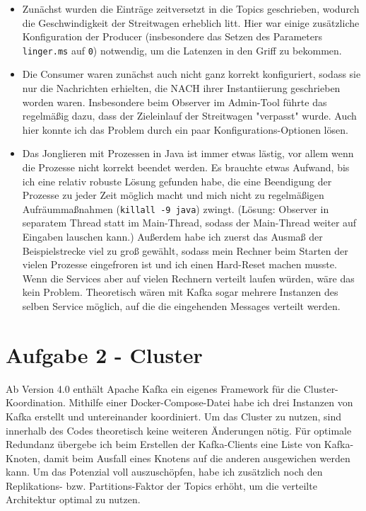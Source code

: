 \documentclass[12pt]{article}
\begin{document}
\begin{itemize}
	\item Zunächst wurden die Einträge zeitversetzt in die Topics geschrieben, wodurch die Geschwindigkeit der Streitwagen erheblich litt. 
	Hier war einige zusätzliche Konfiguration der Producer (insbesondere das Setzen des Parameters \texttt{linger.ms} auf \texttt{0}) notwendig, um die Latenzen in den Griff zu bekommen.
	
	\item Die Consumer waren zunächst auch nicht ganz korrekt konfiguriert, sodass sie nur die Nachrichten erhielten, die NACH ihrer Instantiierung geschrieben worden waren.
	Insbesondere beim Observer im Admin-Tool führte das regelmäßig dazu, dass der Zieleinlauf der Streitwagen "verpasst" wurde.
	Auch hier konnte ich das Problem durch ein paar Konfigurations-Optionen lösen.
	
	\item Das Jonglieren mit Prozessen in Java ist immer etwas lästig, vor allem wenn die Prozesse nicht korrekt beendet werden.
	Es brauchte etwas Aufwand, bis ich eine relativ robuste Lösung gefunden habe, die eine Beendigung der Prozesse zu jeder Zeit möglich macht und mich nicht zu regelmäßigen Aufräummaßnahmen (\texttt{killall -9 java}) zwingt. (Lösung: Observer in separatem Thread statt im Main-Thread, sodass der Main-Thread weiter auf Eingaben lauschen kann.)
	Außerdem habe ich zuerst das Ausmaß der Beispielstrecke viel zu groß gewählt, sodass mein Rechner beim Starten der vielen Prozesse eingefroren ist und ich einen Hard-Reset machen musste.
	Wenn die Services aber auf vielen Rechnern verteilt laufen würden, wäre das kein Problem.
	Theoretisch wären mit Kafka sogar mehrere Instanzen des selben Service möglich, auf die die eingehenden Messages verteilt werden.
\end{itemize}

\section*{Aufgabe 2 - Cluster}
Ab Version 4.0 enthält Apache Kafka ein eigenes Framework für die Cluster-Koordination.
Mithilfe einer Docker-Compose-Datei habe ich drei Instanzen von Kafka erstellt und untereinander koordiniert.
Um das Cluster zu nutzen, sind innerhalb des Codes theoretisch keine weiteren Änderungen nötig.
Für optimale Redundanz übergebe ich beim Erstellen der Kafka-Clients eine Liste von Kafka-Knoten, damit beim Ausfall eines Knotens auf die anderen ausgewichen werden kann.
Um das Potenzial voll auszuschöpfen, habe ich zusätzlich noch den Replikations- bzw. Partitions-Faktor der Topics erhöht, um die verteilte Architektur optimal zu nutzen.
\end{document}
